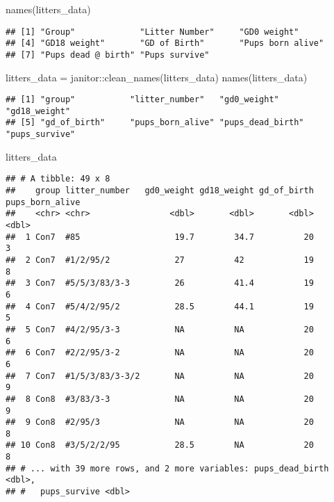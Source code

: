 \documentclass[
]{article}
\newenvironment{Shaded}{\begin{snugshade}}{\end{snugshade}}
\newcommand{\FunctionTok}[1]{\textcolor[rgb]{0.00,0.00,0.00}{#1}}
\newcommand{\NormalTok}[1]{#1}
\newcommand{\OtherTok}[1]{\textcolor[rgb]{0.56,0.35,0.01}{#1}}
\newcommand{\SpecialCharTok}[1]{\textcolor[rgb]{0.00,0.00,0.00}{#1}}
\begin{document}
\begin{Shaded}
\begin{Highlighting}[]
\FunctionTok{names}\NormalTok{(litters\_data)}
\end{Highlighting}
\end{Shaded}

\begin{verbatim}
## [1] "Group"             "Litter Number"     "GD0 weight"       
## [4] "GD18 weight"       "GD of Birth"       "Pups born alive"  
## [7] "Pups dead @ birth" "Pups survive"
\end{verbatim}

\begin{Shaded}
\begin{Highlighting}[]
\NormalTok{litters\_data }\OtherTok{=}\NormalTok{ janitor}\SpecialCharTok{::}\FunctionTok{clean\_names}\NormalTok{(litters\_data)}
\FunctionTok{names}\NormalTok{(litters\_data)}
\end{Highlighting}
\end{Shaded}

\begin{verbatim}
## [1] "group"           "litter_number"   "gd0_weight"      "gd18_weight"    
## [5] "gd_of_birth"     "pups_born_alive" "pups_dead_birth" "pups_survive"
\end{verbatim}

\begin{Shaded}
\begin{Highlighting}[]
\NormalTok{litters\_data}
\end{Highlighting}
\end{Shaded}

\begin{verbatim}
## # A tibble: 49 x 8
##    group litter_number   gd0_weight gd18_weight gd_of_birth pups_born_alive
##    <chr> <chr>                <dbl>       <dbl>       <dbl>           <dbl>
##  1 Con7  #85                   19.7        34.7          20               3
##  2 Con7  #1/2/95/2             27          42            19               8
##  3 Con7  #5/5/3/83/3-3         26          41.4          19               6
##  4 Con7  #5/4/2/95/2           28.5        44.1          19               5
##  5 Con7  #4/2/95/3-3           NA          NA            20               6
##  6 Con7  #2/2/95/3-2           NA          NA            20               6
##  7 Con7  #1/5/3/83/3-3/2       NA          NA            20               9
##  8 Con8  #3/83/3-3             NA          NA            20               9
##  9 Con8  #2/95/3               NA          NA            20               8
## 10 Con8  #3/5/2/2/95           28.5        NA            20               8
## # ... with 39 more rows, and 2 more variables: pups_dead_birth <dbl>,
## #   pups_survive <dbl>
\end{verbatim}
\end{document}
